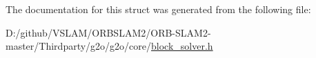 The documentation for this struct was generated from the following file\+:\begin{DoxyCompactItemize}
\item 
D\+:/github/\+V\+S\+L\+A\+M/\+O\+R\+B\+S\+L\+A\+M2/\+O\+R\+B-\/\+S\+L\+A\+M2-\/master/\+Thirdparty/g2o/g2o/core/\mbox{\hyperlink{block__solver_8h}{block\+\_\+solver.\+h}}\end{DoxyCompactItemize}
